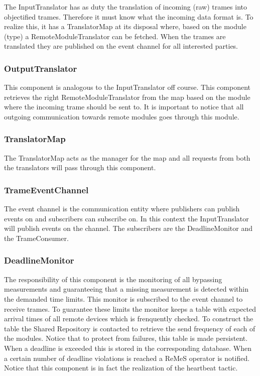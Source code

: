 \npar The InputTranslator has as duty the translation of incoming (raw) trames
into objectified trames. Therefore it must know what the incoming data format
is. To realize this, it has a TranslatorMap at its disposal where, based on
the module (type) a RemoteModuleTranslator can be fetched. When the trames are
translated they are published on the event channel for all interested parties.

\subsubsection{OutputTranslator}

\npar This component is analogous to the InputTranslator off course. This
component retrieves the right RemoteModuleTranslator from the map based on the
module where the incoming trame should be sent to. It is important to notice that all
outgoing communication towards remote modules goes through this module.

\subsubsection{TranslatorMap}

\npar The TranslatorMap acts as the manager for the map and all requests from
both the translators will pass through this component. 

\subsubsection{TrameEventChannel}

\npar The event channel is the communication entity where publishers can publish
events on and subscribers can subscribe on. In this context the InputTranslator
will publish events on the channel. The subscribers are the DeadlineMonitor and
the TrameConsumer.

\subsubsection{DeadlineMonitor}

\npar The responsibility of this component is the monitoring of all bypassing
measurements and guaranteeing that a missing measurement is detected within the
demanded time limits. This monitor is subscribed to the event channel to receive
trames. To guarantee these limits the monitor keeps a table with expected
arrival times of all remote devices which is frenquently checked. To construct
the table the Shared Repository is contacted to retrieve the send frequency of
each of the modules. Notice that to protect from failures, this table is made
persistent. When a deadline is exceeded this is stored in the corresponding
database. When a certain number of deadline violations is reached a ReMeS
operator is notified. Notice that this component is in fact the realization of
the heartbeat tactic.

